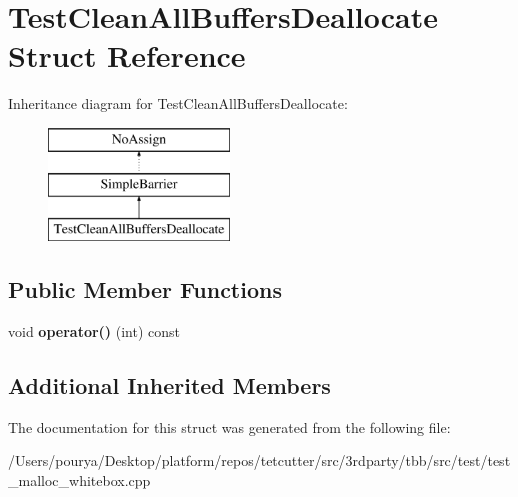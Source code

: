 \hypertarget{structTestCleanAllBuffersDeallocate}{}\section{Test\+Clean\+All\+Buffers\+Deallocate Struct Reference}
\label{structTestCleanAllBuffersDeallocate}
Inheritance diagram for Test\+Clean\+All\+Buffers\+Deallocate\+:\begin{figure}[H]
\begin{center}
\leavevmode
\includegraphics[height=3.000000cm]{structTestCleanAllBuffersDeallocate}
\end{center}
\end{figure}
\subsection*{Public Member Functions}
\begin{DoxyCompactItemize}
\item 
\hypertarget{structTestCleanAllBuffersDeallocate_a761fada17c3acedc6544ebfd67dc5c9e}{}void {\bfseries operator()} (int) const \label{structTestCleanAllBuffersDeallocate_a761fada17c3acedc6544ebfd67dc5c9e}

\end{DoxyCompactItemize}
\subsection*{Additional Inherited Members}


The documentation for this struct was generated from the following file\+:\begin{DoxyCompactItemize}
\item 
/\+Users/pourya/\+Desktop/platform/repos/tetcutter/src/3rdparty/tbb/src/test/test\+\_\+malloc\+\_\+whitebox.\+cpp\end{DoxyCompactItemize}
